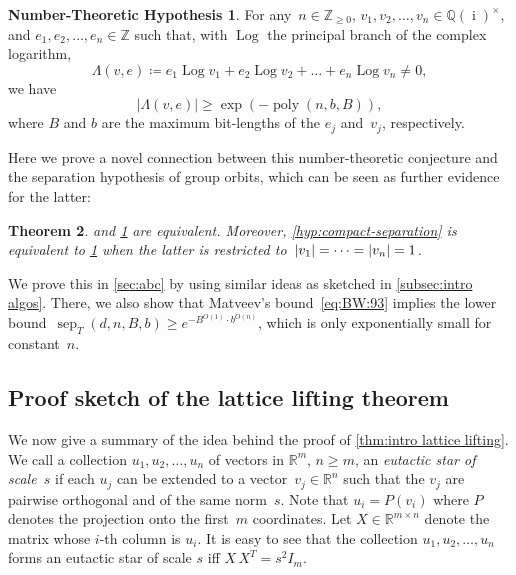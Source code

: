 \documentclass[10pt,a4paper]{article}
\newtheorem{theorem}{Theorem}[section]
\theoremstyle{definition}
\newtheorem{numhypothesis}[theorem]{Number-Theoretic Hypothesis}\crefname{numhypothesis}{Number-Theoretic Hypothesis}{Number-Theoretic Hypotheses}
\DeclareMathOperator{\poly}{poly}
\DeclareMathOperator{\sep}{sep}
\DeclareMathOperator{\ii}{i}
\DeclareMathOperator{\Log}{Log}
\newcommand{\QQ}{\mathbb{Q}}
\newcommand{\ZZ}{\mathbb{Z}}
\newcommand{\RR}{\mathbb{R}}
\newcommand{\NN}{\mathbb{Z}_{\geq 0}}
\DeclarePairedDelimiter\abs{\lvert}{\rvert}
\numberwithin{equation}{section}
\begin{document}
\begin{numhypothesis}\label{hyp:linearforms}
For any~$n\in\NN$, $v_1,v_2,\dots,v_n\in\QQ(\ii)^\times$, and $e_1,e_2,\dots,e_n\in\ZZ$ such that,
with $\Log$ the principal branch of the complex logarithm,
\[
  \Lambda(v,e) \coloneqq e_1 \Log v_1 + e_2 \Log v_2 +\dots +e_n\Log v_n \neq 0,
\]
we have
\[
	|\Lambda(v,e)| \geq \exp(-\poly(n,b,B)),
\]
where $B$ and $b$ are the maximum bit-lengths of the $e_j$ and~$v_j$, respectively.
\end{numhypothesis}

Here we prove a novel connection between this number-theoretic conjecture and
the separation hypothesis of group orbits, which can be seen as further evidence for the latter:

\begin{theorem}\label{thm:abc-and-sep}
 and \cref{hyp:linearforms} are equivalent.
Moreover, \cref{hyp:compact-separation} is equivalent to \cref{hyp:linearforms}
when the latter is restricted to~$\abs{v_1}=\dots=\abs{v_n}=1$.
\end{theorem}

We prove this in \cref{sec:abc} by using similar ideas as sketched in \cref{subsec:intro algos}.
There, we also show that Matveev's bound~\eqref{eq:BW:93} implies
the lower bound~$\sep_T(d,n,B,b) \geq e^{-B^{O(1)} \cdot b^{O(n)}}$,
which is only exponentially small for constant~$n$.

\subsection{Proof sketch of the lattice lifting theorem}\label{subsec:proof ideas}
We now give a summary of the idea behind the proof of \cref{thm:intro lattice lifting}.
We call a collection $u_1,u_2,\dots,u_n$ of vectors in $\RR^m$, $n\ge m$,
an \emph{eutactic star of scale~$s$}
if each $u_j$ can be extended to a vector~$v_j\in\RR^n$ such that the $v_j$ are pairwise orthogonal
and of the same norm~$s$.
Note that $u_i=P(v_i)$ where $P$ denotes the projection onto the first~$m$ coordinates.
Let $X\in\RR^{m\times n}$ denote the matrix whose $i$-th column is $u_i$.
It is easy to see that the collection $u_1,u_2,\dots,u_n$ forms an eutactic star of scale $s$
iff $X\, X^T = s^2 I_m$.
\end{document}
